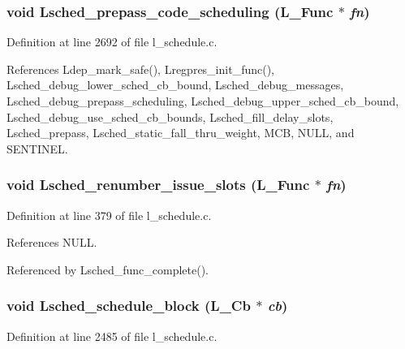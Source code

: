 \subsubsection{\setlength{\rightskip}{0pt plus 5cm}void Lsched\_\-prepass\_\-code\_\-scheduling (L\_\-Func $\ast$ {\em fn})}\label{l__schedule_8c_d4ed46984d617a811319d1f38f269481}




Definition at line 2692 of file l\_\-schedule.c.

References Ldep\_\-mark\_\-safe(), Lregpres\_\-init\_\-func(), Lsched\_\-debug\_\-lower\_\-sched\_\-cb\_\-bound, Lsched\_\-debug\_\-messages, Lsched\_\-debug\_\-prepass\_\-scheduling, Lsched\_\-debug\_\-upper\_\-sched\_\-cb\_\-bound, Lsched\_\-debug\_\-use\_\-sched\_\-cb\_\-bounds, Lsched\_\-fill\_\-delay\_\-slots, Lsched\_\-prepass, Lsched\_\-static\_\-fall\_\-thru\_\-weight, MCB, NULL, and SENTINEL.
\subsubsection{\setlength{\rightskip}{0pt plus 5cm}void Lsched\_\-renumber\_\-issue\_\-slots (L\_\-Func $\ast$ {\em fn})}\label{l__schedule_8c_e494cec59630ffe567ad5b8a1062ab5c}




Definition at line 379 of file l\_\-schedule.c.

References NULL.

Referenced by Lsched\_\-func\_\-complete().
\subsubsection{\setlength{\rightskip}{0pt plus 5cm}void Lsched\_\-schedule\_\-block (L\_\-Cb        $\ast$ {\em cb})}\label{l__schedule_8c_7d9e535e6ceefbc9b8be92d3349d67a0}




Definition at line 2485 of file l\_\-schedule.c.

